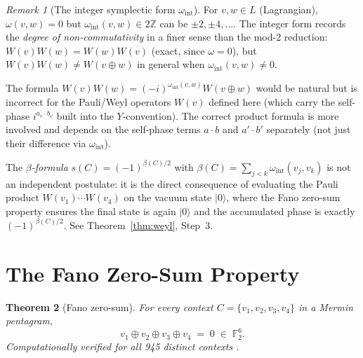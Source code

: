 \documentclass[11pt,a4paper]{article}
\newtheorem{theorem}{Theorem}[section]
\theoremstyle{remark}
\newtheorem{remark}[theorem]{Remark}
\begin{document}
\begin{remark}[The integer symplectic form $\omega_{\mathrm{int}}$]
\label{rem:intform}
For $v, w \in L$ (Lagrangian), $\omega(v,w) = 0$ but
$\omega_{\mathrm{int}}(v,w) \in 2\mathbb{Z}$ can be $\pm 2, \pm 4, \ldots$.
The integer form records the \emph{degree of non-commutativity} in a finer
sense than the mod-2 reduction:
$W(v)W(w) = W(w)W(v)$ (exact, since $\omega = 0$),
but $W(v)W(w) \neq W(v \oplus w)$ in general when $\omega_{\mathrm{int}}(v,w) \neq 0$.

The formula $W(v)W(w) = (-i)^{\omega_{\mathrm{int}}(v,w)} W(v \oplus w)$
would be natural but is incorrect for the Pauli/Weyl operators $W(v)$
defined here (which carry the self-phase $i^{a_v \cdot b_v}$ built into
the $Y$-convention).
The correct product formula is more involved and depends on the
self-phase terms $a \cdot b$ and $a' \cdot b'$ separately
(not just their difference via $\omega_{\mathrm{int}}$).

The \emph{$\beta$-formula} $s(C) = (-1)^{\beta(C)/2}$ with
$\beta(C) = \sum_{j<k} \omega_{\mathrm{int}}(v_j, v_k)$
is not an independent postulate: it is the direct consequence of
evaluating the Pauli product $W(v_1) \cdots W(v_4)$ on the vacuum
state $|0\rangle$, where the Fano zero-sum property ensures the
final state is again $|0\rangle$ and the accumulated phase is
exactly $(-1)^{\beta(C)/2}$.
See Theorem~\ref{thm:weyl}, Step~3.
\end{remark}


\section{The Fano Zero-Sum Property}\label{sec:fano}

\begin{theorem}[Fano zero-sum]\label{thm:fano}
For every context $C = \{v_1, v_2, v_3, v_4\}$ in a Mermin pentagram,
\[
  v_1 \oplus v_2 \oplus v_3 \oplus v_4 \;=\; 0 \;\in\; \mathbb{F}_2^6.
\]
Computationally verified for all 945 distinct contexts \cite{PaperXVIsuppl}.
\end{theorem}
\end{document}
